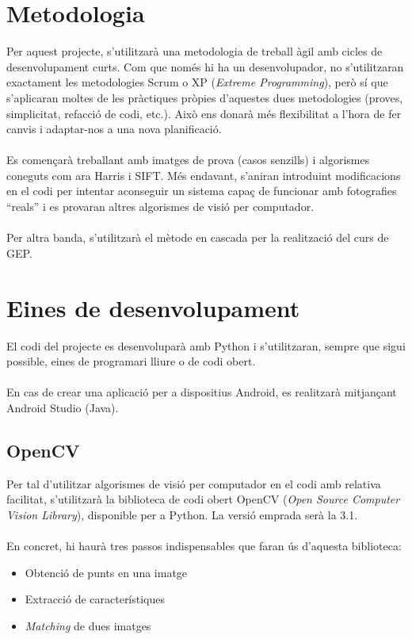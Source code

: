 \section{Metodologia}
	Per aquest projecte, s'utilitzarà una metodologia de treball àgil amb cicles de desenvolupament curts.
	Com que només hi ha un desenvolupador, no s'utilitzaran exactament les metodologies Scrum o XP\cite{Pxp} (\textit{Extreme Programming}),
	però sí que s'aplicaran moltes de les pràctiques pròpies d'aquestes dues metodologies (proves, simplicitat, refacció de codi, etc.).
	Això ens donarà més flexibilitat a l'hora de fer canvis i adaptar-nos a una nova planificació.\\\\
	Es començarà treballant amb imatges de prova (casos senzills) i algorismes coneguts com ara Harris\cite{Harris} i SIFT. Més endavant, s'aniran introduint modificacions en el codi per intentar aconseguir un
	sistema capaç de funcionar amb fotografies ``reals'' i es provaran altres algorismes de visió per computador.\\\\
	Per altra banda, s'utilitzarà el mètode en cascada per la realització del curs de GEP.
\section{Eines de desenvolupament}
	El codi del projecte es desenvoluparà amb Python i s'utilitzaran, sempre que sigui possible, eines de programari lliure o de codi obert.\\\\
	En cas de crear una aplicació per a dispositius Android, es realitzarà mitjançant Android Studio (Java).
	\subsection{OpenCV}
		Per tal d'utilitzar algorismes de visió per computador en el codi amb relativa facilitat, s'utilitzarà la biblioteca de codi obert OpenCV\cite{OpenCV} (\textit{Open Source Computer Vision Library}),
		disponible per a Python. La versió emprada serà la 3.1.\\\\
		En concret, hi haurà tres passos indispensables que faran ús d'aquesta biblioteca:\\
		\begin{itemize}
			\item {Obtenció de punts en una imatge}
			\item {Extracció de característiques}
			\item \textit{Matching} de dues imatges
		\end{itemize}
